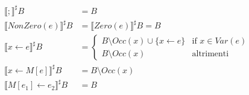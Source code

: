 \documentclass[a4paper, 10pt]{book}
\begin{document}
\begin{align*}
	\llbracket ; \rrbracket^\sharp B &= B\\
	\llbracket NonZero(e) \rrbracket^\sharp B &= \llbracket Zero(e) \rrbracket^\sharp B = B \\
	\llbracket x\gets e \rrbracket^\sharp B &= 
    	\begin{cases}
    		B \setminus Occ(x) \cup \{x\gets e \} & \text{if } x \in Var(e) \\
    		B \setminus Occ(x) & \text{altrimenti}
    	\end{cases} \\
	\llbracket x \gets M[e] \rrbracket^\sharp B &= B \setminus Occ(x) \\
	\llbracket M[e_1]\gets e_2 \rrbracket^\sharp B &= B
\end{align*}
\end{document}
